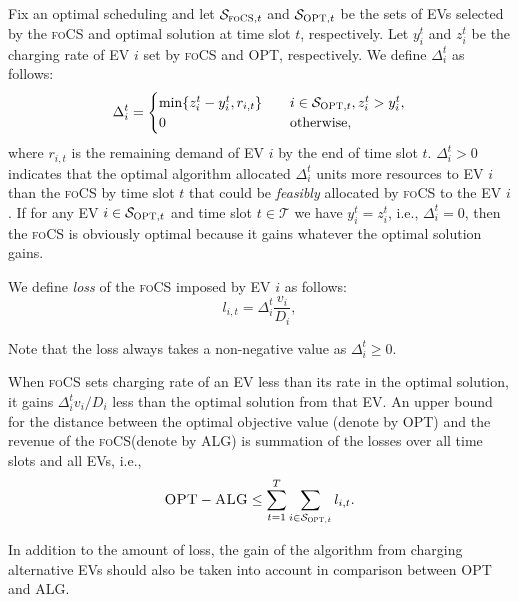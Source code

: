 \documentclass[journal]{IEEEtran}
\newcommand{\rev}[1]{{\color{black}#1}}%
\newcommand{\rev}[1]{#1}
\newcommand{\focs}{\textsc{foCS}\xspace}
\newcommand{\opt}{\textsc{OPT}\xspace}
\newcommand{\alg}{\textsc{ALG}\xspace}
\begin{document}
Fix an optimal scheduling and let $\mathcal{S}_{\focs,t}$ and $\mathcal{S}_{\opt,t}$ be the sets of EVs selected by the \focs and optimal solution at time slot $t$, respectively. Let $y_{i}^t$ and $z_{i}^t$ be the charging rate of EV $i$ set by \focs and \opt, respectively. We define $\Delta_{i}^t$ as follows:
\begin{equation}
\label{eq:delta}
\Delta_{i}^t =
     \begin{cases}
       \min\{z_{i}^t-y_{i}^t,r_{i,t}\} &\quad i\in\mathcal{S}_{\opt,t},z_{i}^t>y_{i}^t, \\
       0& \quad\text{otherwise},  \\
     \end{cases}
\end{equation}
where $r_{i,t}$ is the remaining demand of EV $i$ by the end of time slot $t$. $\Delta_{i}^t>0$ indicates that the optimal algorithm allocated $\Delta_{i}^t$ units more resources to EV $i$ than the \focs by time slot $t$ that could be \emph{feasibly} allocated by \focs to the EV $i$. If for any EV $i\in\mathcal{S}_{\opt,t}$ and time slot $t\in\mathcal{T}$ we have $y_{i}^t=z_{i}^t$, i.e., $\Delta_{i}^t=0$, then the \focs is obviously optimal because it gains whatever the optimal solution gains. \rev{We define \textit{loss} of the \focs imposed by EV $i$ as follows:
\begin{equation}
\label{lBj0}
l_{i,t}=\Delta_{i}^t\frac{v_i}{D_i},
\end{equation}

Note that the loss always takes a non-negative value as $\Delta_i^t\geq 0$.} When \focs sets charging rate of an EV less than its rate in the optimal solution, it gains $\Delta_{i}^t v_i/D_i$ less than the optimal solution from that EV. An upper bound for the distance between the optimal objective value (denote by \opt) and the revenue of the \focs (denote by \alg) is summation of the losses over all time slots and all EVs, i.e., 
\begin{equation}
\label{eq:optdist}
\opt-\alg\leq \sum_{t=1}^T\sum_{i\in\mathcal{S}_{\opt,t}} l_{i,t}.
\end{equation}

In addition to the amount of loss, the gain of the algorithm from charging alternative EVs should also be taken into account in comparison between \opt and \alg. 
\end{document}
